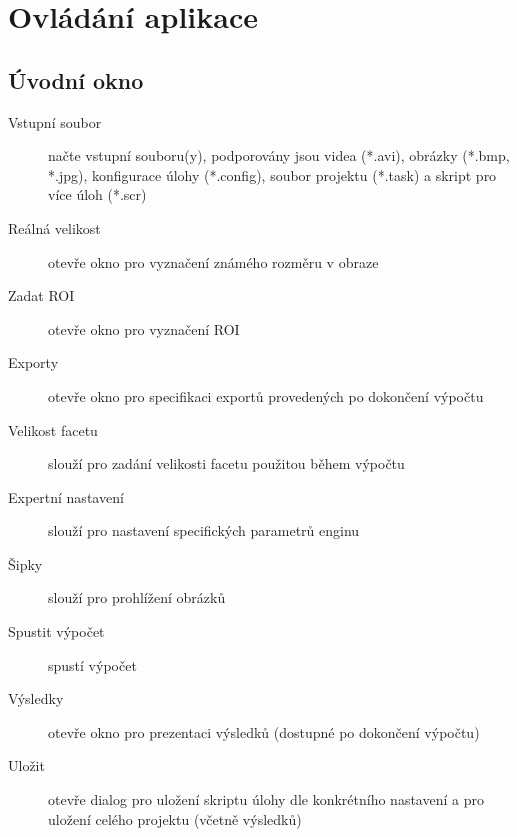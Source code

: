 \documentclass[a4paper,12pt]{article}
\begin{document}
\section{Ovládání aplikace}
\label{sec:gui}
\subsection{Úvodní okno}
\begin{figure}[H]
\end{figure}
\begin{description}
\item[Vstupní soubor] načte vstupní souboru(y), podporovány jsou videa (*.avi), obrázky (*.bmp, *.jpg), konfigurace úlohy (*.config), soubor projektu (*.task) a skript pro více úloh (*.scr)
\item[Reálná velikost] otevře okno pro vyznačení známého rozměru v obraze
\item[Zadat ROI] otevře okno pro vyznačení ROI
\item[Exporty] otevře okno pro specifikaci exportů provedených po dokončení výpočtu
\item[Velikost facetu] slouží pro zadání velikosti facetu použitou během výpočtu
\item[Expertní nastavení] slouží pro nastavení specifických parametrů enginu
\item[Šipky] slouží pro prohlížení obrázků
\item[Spustit výpočet] spustí výpočet
\item[Výsledky] otevře okno pro prezentaci výsledků (dostupné po dokončení výpočtu)
\item[Uložit] otevře dialog pro uložení skriptu úlohy dle konkrétního nastavení a pro uložení celého projektu (včetně výsledků)        
\end{description}
\newpage
\end{document}
